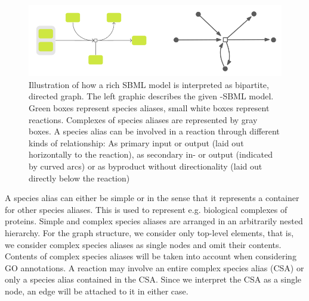 \documentclass[
	fontsize=10pt, %
	twoside=true, %
	secnumdepth=1, %
  toc=indentunnumbered %
]{kaobook}
\begin{document}
\begin{figure}[h]
  \centering
  \includegraphics[width=0.7\linewidth]{graph-interpretation.png}
  \caption[Illustration how a rich SBML model is interpreted as a
  graph.]{Illustration of how a rich SBML model is interpreted as bipartite,
    directed graph. The left graphic describes the given -SBML model. Green
    boxes represent species aliases, small white boxes represent reactions.
    Complexes of species aliases are represented by gray boxes. A species alias
    can be involved in a reaction through different kinds of relationship: As
    primary input or output (laid out horizontally to the reaction), as
    secondary in- or output (indicated by curved arcs) or as byproduct without
    directionality (laid out directly below the reaction)}
  \label{fig:graph-construction}
\end{figure}



A species alias can either be simple or  in the sense that it
represents a container for other species aliases. This is used to represent e.g.
biological complexes of proteins. Simple and complex species aliases are
arranged in an arbitrarily nested hierarchy. For the graph structure, we
consider only top-level elements, that is, we consider complex species aliases
as single nodes and omit their contents. Contents of complex species aliases
will be taken into account when considering GO annotations. A reaction may
involve an entire complex species alias (CSA) or only a species alias contained
in the CSA. Since we interpret the CSA as a single node, an edge will be
attached to it in either case.
\end{document}
